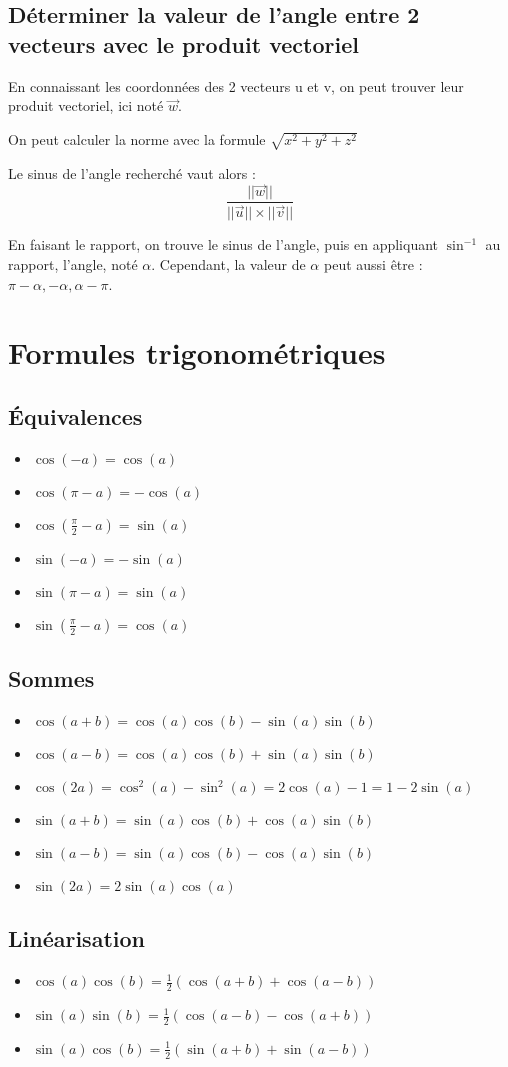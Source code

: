 \documentclass[french]{yLectureNote}
\renewcommand{\vec}{\overrightarrow}
\newcommand{\norm}[1]{||\overrightarrow{#1}||}
\begin{document}
\subsection{Déterminer la valeur de l'angle entre 2 vecteurs avec le produit vectoriel}
En connaissant les coordonnées des 2 vecteurs u et v, on peut trouver leur produit vectoriel, ici noté $\vec{w}$.

On peut calculer la norme avec la formule $\sqrt{x^2+y^2+z^2}$

Le sinus de l'angle recherché vaut alors : \[\frac{\norm{w}}{\norm{u}\times\norm{v}}\]

En faisant le rapport, on trouve le sinus de l'angle, puis en appliquant $\sin^{-1}$ au rapport, l'angle, noté $\alpha$. Cependant, la valeur de $\alpha$ peut aussi \^etre : $\pi-\alpha, -\alpha, \alpha-\pi$.
\section{Formules trigonométriques}
\subsection{Équivalences}
\begin{itemize}
 \item $\cos(-a) = \cos (a)$
 \item $\cos(\pi-a) = - \cos(a)$
 \item $\cos(\frac{\pi}{2}-a) = \sin (a)$
 \item $\sin(-a) = - \sin(a)$
 \item $\sin(\pi-a) = \sin(a)$
 \item $\sin(\frac{\pi}{2}-a) = \cos(a)$
\end{itemize}
\subsection{Sommes}
\begin{itemize}
 \item $\cos(a+b) = \cos(a)\cos(b) - \sin(a)\sin(b)$
 \item $\cos (a-b) = \cos(a)\cos(b) + \sin(a)\sin(b)$
 \item $\cos(2a) = \cos^2(a)-\sin^2(a) = 2\cos(a)-1=1-2\sin(a)$
 \item $\sin(a+b) = \sin(a)\cos(b)+\cos(a)\sin(b)$
 \item $\sin(a-b) = \sin(a)\cos(b)-\cos(a)\sin(b)$
 \item $\sin(2a) = 2\sin(a)\cos(a)$
\end{itemize}
\subsection{Linéarisation}
\begin{itemize}
 \item $\cos(a)\cos(b) = \frac{1}{2}(\cos(a+b)+\cos(a-b))$
 \item $\sin(a)\sin(b) = \frac{1}{2}(\cos(a-b)-\cos(a+b))$
 \item $\sin(a)\cos(b) =  \frac{1}{2}(\sin(a+b)+\sin(a-b))$
\end{itemize}
\end{document}
